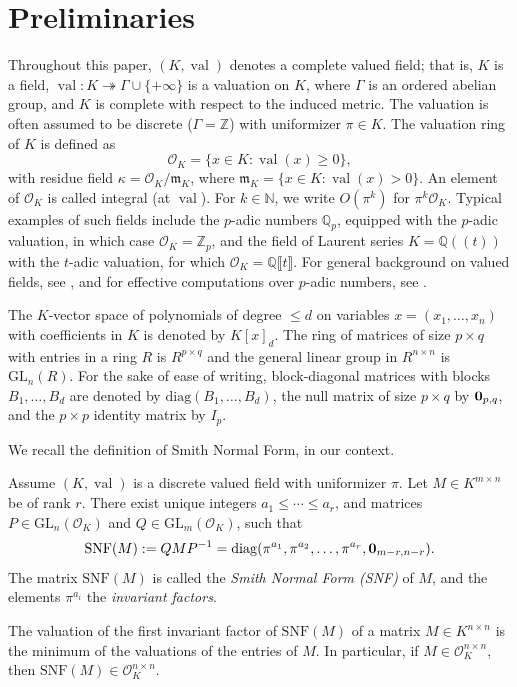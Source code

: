 \documentclass{elsarticle}
\theoremstyle{plain}
\theoremstyle{definition}
\newcommand{\N}{\mathbb{N}} %
\DeclareMathOperator{\val}{val}
\def\QQ{\ensuremath{\mathbb{Q}}}
\def\ZZ{\ensuremath{\mathbb{Z}}}
\newcommand{\OK}{\mathcal{O}_K}
\def\diag{\mathrm{diag}}
\newcommand{\GL}{\mathrm{GL}}
\begin{document}
\section{Preliminaries}
\label{sec:prelim}

Throughout this paper, $(K,\val)$ denotes a complete valued field; that is, $K$ is a field,
$\val : K \twoheadrightarrow \Gamma \cup \{+\infty\}$ is a valuation on $K$, where $\Gamma$ 
is an ordered abelian group, and $K$ is complete with respect to the induced metric.
The valuation is often assumed to be discrete ($\Gamma=\ZZ$)
with uniformizer $\pi \in K$. The valuation ring of $K$ is defined as
$$
\OK = \{x \in K : \val(x) \geq 0\},
$$
with residue field $\kappa = \OK/\mathfrak{m}_K$, where
$\mathfrak{m}_K = \{x \in K : \val(x) > 0\}$.
An element of $\OK$ is called integral (at $\val$).
For $k \in \N$, we write $O(\pi^k)$ for $\pi^k \OK$.
Typical examples of such fields include the $p$-adic numbers 
$\QQ_p$, equipped with the $p$-adic valuation, in which case $\OK = \ZZ_p$, 
and the field of Laurent series
$K=\QQ(\!(t)\!)$ with the $t$-adic valuation,
for which $\OK = \QQ \llbracket t \rrbracket$.
For general background on valued fields, see \cite{Serre:1979,engler2005valued},
and for effective computations over $p$-adic numbers, see \cite{caruso_computations_2017}.

The $K$-vector space of polynomials of degree $\leq d$ on variables
$x=(x_1,\ldots,x_n)$
with coefficients in $K$ is denoted by $K[x]_{d}$. The ring of matrices of
size $p \times q$ with entries in a ring $R$ is $R^{p \times q}$ and the general
linear group in $R^{n \times n}$ is $\GL_n(R)$.
For the sake of ease of writing, block-diagonal matrices with blocks
$B_1,\ldots,B_d$ are denoted by $\diag(B_1, \ldots, B_d)$, the null matrix of
size $p \times q$ by ${\bf 0}_{p,q}$, and the $p \times p$ identity matrix by $I_p$.

We recall the definition of Smith Normal Form, in our context.

\begin{definition}\label{smith_nf}
  Assume $(K,\val)$ is a discrete valued field with uniformizer $\pi$.
  Let $M \in K^{m \times n}$ be of rank $r$. There exist unique integers
  $a_1 \leq \cdots \leq a_r$, and
  matrices $P \in \GL_n(\OK)$ and $Q \in \GL_m(\OK)$, such that
  $$
  \mathrm{SNF}(M) := QMP^{-1} = \diag(\pi^{a_1}, \pi^{a_2}, \ldots, \pi^{a_r}, {\bf 0}_{m-r,n-r}).
  $$
  The matrix $\mathrm{SNF}(M)$ is called the \emph{Smith Normal Form (SNF)} of $M$, and the elements $\pi^{a_i}$ the
  \emph{invariant factors}.
\end{definition}
\begin{remark}
  The valuation of the first invariant factor of $\mathrm{SNF}(M)$ of a matrix
  $M \in K^{n \times n}$ is the minimum of the valuations of the entries of
  $M$. In particular, if $M \in \OK^{n \times n}$, then $\mathrm{SNF}(M) \in \OK^{n \times n}$.
\end{remark}
\end{document}
